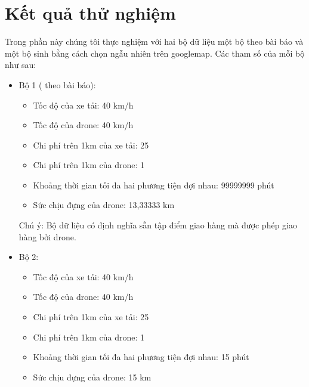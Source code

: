 \documentclass[a4paper,12pt]{report}
\begin{document}
\chapter{Kết quả thử nghiệm}
Trong phần này chúng tôi thực nghiệm với hai bộ dữ liệu một bộ theo bài báo \cite{main} và một bộ sinh bằng cách chọn ngẫu nhiên trên googlemap. Các tham số của mỗi bộ như sau:
\begin{itemize}
\item Bộ 1 ( theo bài báo): 
\begin{itemize}
\item Tốc độ của xe tải: 40 km/h
\item Tốc độ của drone: 40 km/h
\item Chi phí trên 1km của xe tải: 25
\item Chi phí trên 1km của drone: 1
\item Khoảng thời gian tối đa hai phương tiện đợi nhau: 99999999 phút
\item Sức chịu đựng của drone: 13,33333 km
\end{itemize}
Chú ý: Bộ dữ liệu có định nghĩa sẵn tập điểm giao hàng mà được phép giao hàng bởi drone.
\item Bộ 2: 
\begin{itemize}
\item Tốc độ của xe tải: 40 km/h
\item Tốc độ của drone: 40 km/h
\item Chi phí trên 1km của xe tải: 25
\item Chi phí trên 1km của drone: 1
\item Khoảng thời gian tối đa hai phương tiện đợi nhau: 15 phút
\item Sức chịu đựng của drone: 15 km
\end{itemize}
\end{itemize}
\end{document}
